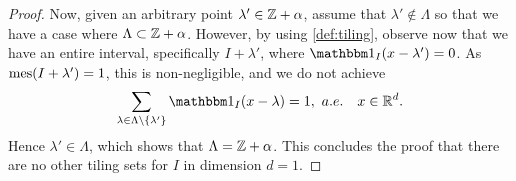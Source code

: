\documentclass[../thesis.tex]{subfiles}
\begin{document}
\begin{proof}
    Now, given an arbitrary point $\lambda' \in \mathbb{Z} +\alpha$, assume that $\lambda'\notin \Lambda$ so that we have a case where $\Lambda \subset \mathbb{Z}+\alpha$. However, by using \cref{def:tiling}, observe now that we have an entire interval, specifically $I+\lambda'$, where $\indicator{I}{x - \lambda'} = 0$. As $\operatorname{mes}(I+\lambda') = 1 $, this is non-negligible, and we do not achieve
    \begin{equation*}
        \sum_{\lambda \in \Lambda\setminus \braq{\lambda'}} \indicator{I}{x-\lambda} = 1, \text{\space} a.e. \quad x \in \R^d.
    \end{equation*}
    Hence $\lambda' \in \Lambda$, which shows that $\Lambda = \mathbb{Z}+\alpha$. This concludes the proof that there are no other tiling sets for $I$ in dimension $d=1$. 




\end{proof}
\end{document}
